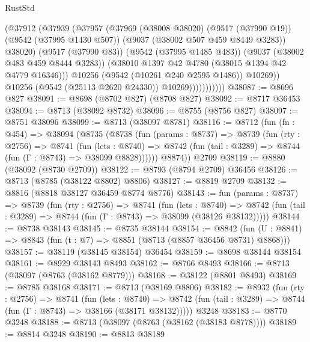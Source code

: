 \begin{lexlean}{RustStd}
\begin{coremodule}
                          (@37912
                            (@37939
                              (@37957
                                (@37969
                                  (@38008 @38020)
                                  (@9517 (@37990 @19))
                                  (@9542 (@37995 @1430 @507))
                                  (@9037 (@38002 @507 @459 @8449 @3283))
                                  @38020)
                                (@9517 (@37990 @83))
                                (@9542 (@37995 @1485 @483))
                                (@9037 (@38002 @483 @459 @8444 @3283))
                                (@38010 @1397 @42 @4780 (@38015 @1394 @42 @4779 @16346)))
                              @10256
                              (@9542 (@10261 @240 @2595 @1486))
                              @10269))
                          @10256
                          (@9542 (@25113 @2620 @24330))
                          @10269)))))))))))
@38087 := @8696 @827
@38091 := @8698 (@8702 @827) (@8708 @827)
@38092 := @8717 @36453
@38094 := @8713 (@38092 @8732)
@38096 := @8755 (@8756 @827)
@38097 := @8751 @38096
@38099 := @8713 (@38097 @8781)
@38116 := @8712
    (fun (fn : @454) =>
    @38094
      (@8735
        (@8738
          (fun (params : @8737) =>
          @8739
            (fun (rty : @2756) =>
            @8741
              (fun (lets : @8740) =>
              @8742 (fun (tail : @3289) => @8744 (fun (Γ : @8743) => @38099 @8828))))))
        @8874))
    @2709
@38119 := @8880 (@38092 (@8730 @2709))
@38122 := @8793 (@8794 @2709) @36456
@38126 := @8713 (@8785 (@38122 @8802) @8806)
@38127 := @8819 @2709
@38132 := @8816 (@8818 @38127 @36459 @8774 @8776)
@38143 := fun (params : @8737) =>
  @8739
    (fun (rty : @2756) =>
    @8741
      (fun (lets : @8740) =>
      @8742 (fun (tail : @3289) => @8744 (fun (Γ : @8743) => @38099 (@38126 @38132)))))
@38144 := @8738 @38143
@38145 := @8735 @38144
@38154 := @8842
    (fun (U : @8841) => @8843 (fun (t : @7) => @8851 (@8713 (@8857 @36456 @8731) @8868)))
@38157 := @38119 (@38145 @38154) @36454
@38159 := @8698 @38144 @38154
@38161 := @8929 @38143 @8493
@38162 := @8766 @8493
@38166 := @8713 (@38097 (@8763 (@38162 @8779)))
@38168 := @38122 (@8801 @8493)
@38169 := @8785 @38168
@38171 := @8713 (@38169 @8806)
@38182 := @8932
    (fun (rty : @2756) =>
    @8741
      (fun (lets : @8740) =>
      @8742 (fun (tail : @3289) => @8744 (fun (Γ : @8743) => @38166 (@38171 @38132)))))
    @3248
@38183 := @8770 @3248
@38188 := @8713 (@38097 (@8763 (@38162 (@38183 @8778))))
@38189 := @8814 @3248
@38190 := @8813 @38189

\end{coremodule}
\end{lexlean}
